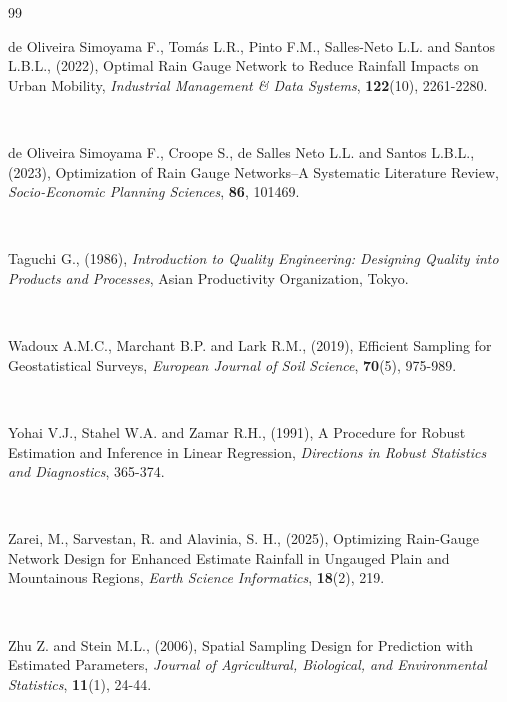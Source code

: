 \documentclass[10pt,twoside]{article}
\numberwithin{equation}{section}
\begin{document}
\begin{thebibliography}{99}
 


de Oliveira Simoyama F., Tom\'{a}s L.R., Pinto F.M., Salles-Neto L.L. and Santos L.B.L., (2022), Optimal Rain Gauge Network to Reduce Rainfall Impacts on Urban Mobility, {\it Industrial Management \& Data Systems}, \textbf{122}(10), 2261-2280.

 


de Oliveira Simoyama F., Croope S., de Salles Neto L.L. and Santos L.B.L., (2023), Optimization of Rain Gauge Networks--A Systematic Literature Review, {\it Socio-Economic Planning Sciences}, \textbf{86}, 101469.

 


Taguchi G., (1986), {\it Introduction to Quality Engineering: Designing Quality into Products and Processes}, Asian Productivity Organization, Tokyo.

 


Wadoux A.M.C., Marchant B.P. and Lark R.M., (2019), Efficient Sampling for Geostatistical Surveys, {\it European Journal of Soil Science}, \textbf{70}(5), 975-989.

 


Yohai V.J., Stahel W.A. and Zamar R.H., (1991), A Procedure for Robust Estimation and Inference in Linear Regression, {\it Directions in Robust Statistics and Diagnostics}, 365-374.

 


Zarei, M., Sarvestan, R. and Alavinia, S. H., (2025), Optimizing Rain-Gauge Network Design for Enhanced Estimate Rainfall in Ungauged Plain and Mountainous Regions, {\it Earth Science Informatics}, \textbf{18}(2), 219.

 


Zhu Z. and Stein M.L., (2006), Spatial Sampling Design for Prediction with Estimated Parameters, {\it Journal of Agricultural, Biological, and Environmental Statistics}, \textbf{11}(1), 24-44.

 

\end{thebibliography}
\end{document}
